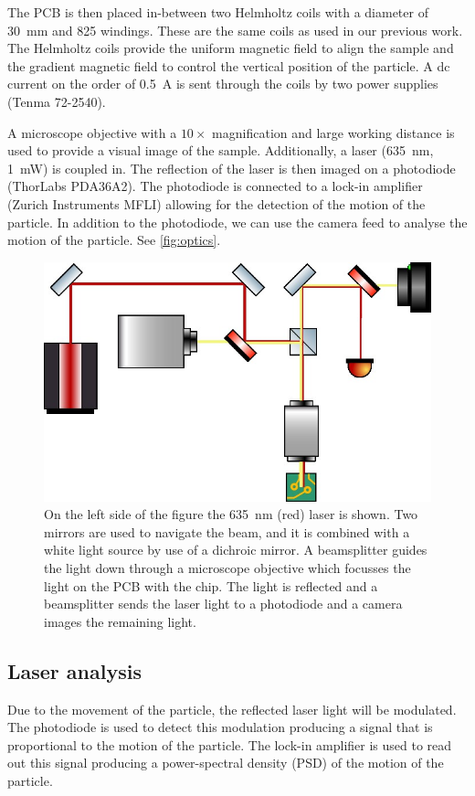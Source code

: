 The PCB is then placed in-between two Helmholtz coils with a diameter of \qty{30}{\mm} and 825 windings. These are the same coils as used in our previous work\cite{eli,mart}. The Helmholtz coils provide the uniform magnetic field to align the sample and the gradient magnetic field to control the vertical position of the particle. A dc current on the order of \qty{0.5}{\ampere} is sent through the coils by two power supplies (Tenma 72-2540).

A microscope objective with a $10\times$ magnification and large working distance is used to provide a visual image of the sample. Additionally, a laser (\qty{635}{\nm}, \qty{1}{\milli\watt}) is coupled in. The reflection of the laser is then imaged on a photodiode (ThorLabs PDA36A2). The photodiode is connected to a lock-in amplifier (Zurich Instruments MFLI) allowing for the detection of the motion of the particle. In addition to the photodiode, we can use the camera feed to analyse the motion of the particle. See \autoref{fig:optics}.

\begin{figure}
    \centering
    \includegraphics{figures/optics.jpg}
    \caption{On the left side of the figure the \qty{635}{\nm} (red) laser is shown. Two mirrors are used to navigate the beam, and it is combined with a white light source by use of a dichroic mirror. A beamsplitter guides the light down through a microscope objective which focusses the light on the PCB with the chip. The light is reflected and a beamsplitter sends the laser light to a photodiode and a camera images the remaining light.}
    \label{fig:optics}
\end{figure}

\subsection{Laser analysis}
Due to the movement of the particle, the reflected laser light will be modulated. The photodiode is used to detect this modulation producing a signal that is proportional to the motion of the particle. The lock-in amplifier is used to read out this signal producing a power-spectral density (PSD) of the motion of the particle.

